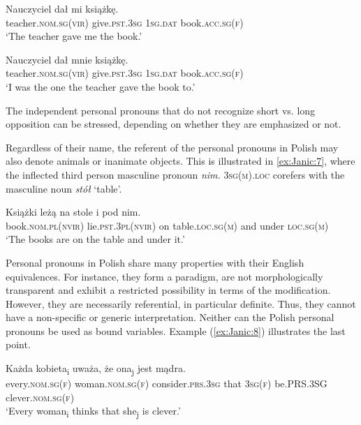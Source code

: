 \documentclass[output=paper]{langscibook}
\begin{document}
\ea \label{ex:Janic:6}
\ea \label{ex:Janic:6a}
\gll Nauczyciel	  dał  mi	 książkę. \\
		teacher.\textsc{nom.sg(vir)}	give.\textsc{pst.3sg}	\textsc{1sg.dat}	 book.\textsc{acc.sg(f)}\\
\glt ‘The teacher gave me the book.’

\ex \label{ex:Janic:6b}
\gll Nauczyciel	 dał  mnie książkę.\\
		teacher.\textsc{nom.sg(vir)}	give.\textsc{pst.3sg}	\textsc{1sg.dat}	 book.\textsc{acc.sg(f)}\\
\glt	‘I was the one the teacher gave the book to.’ \citep[65]{Feldstein2001}
\z
\z

The independent personal pronouns that do not recognize short vs. long opposition can be stressed, depending on whether they are emphasized or not. 

Regardless of their name, the referent of the personal pronouns in Polish may also denote animals or inanimate objects. This is illustrated in \ref{ex:Janic:7}, where the inflected third person masculine pronoun \textit{nim.} \textsc{3sg(m).loc} corefers with the masculine noun \textit{stół} ‘table’.

\ea \label{ex:Janic:7}
\gll Książki	 leżą 	 na 	stole 	 i 	 pod 	nim.\\
 book.\textsc{nom.pl(nvir)}	lie.\textsc{pst.3pl(nvir)}	on	table.\textsc{loc.sg(m)}	and 	under	\textsc{loc.sg(m)} \\	
\glt ‘The books are on the table and under it.’ \citep[265]{Sadowska2012}
\z

Personal pronouns in Polish share many properties with their English equivalences. For instance, they form a paradigm, are not morphologically transparent and exhibit a restricted possibility in terms of the modification. However, they are necessarily referential, in particular definite. Thus, they cannot have a non-specific or generic interpretation. Neither can the Polish personal pronouns be used as bound variables. Example (\ref{ex:Janic:8}) illustrates the last point.

\ea \label{ex:Janic:8}
\ea \label{ex:Janic:8a}
\gll Każda	 kobieta\textsubscript{i}	uważa, 	 że	 ona\textsubscript{j}	jest		 mądra.\\
 every.\textsc{nom.sg(f)}	woman.\textsc{nom.sg(f)} consider.\textsc{prs.3sg}	that	\textsc{3sg(f)} be.\textsc{PRS.3SG}	clever.\textsc{nom.sg(f)}\\
\glt ‘Every woman\textsubscript{i} thinks that she\textsubscript{j} is clever.’
\end{document}
